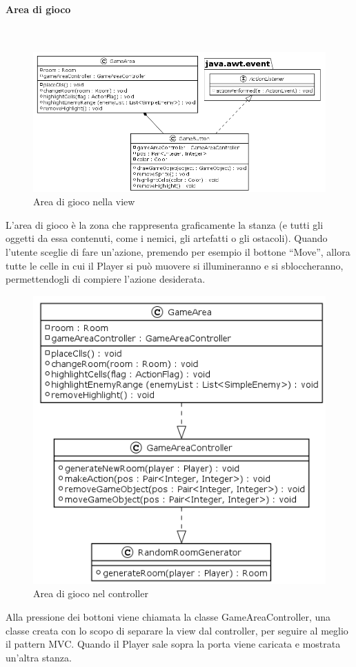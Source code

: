 \documentclass[a4paper,titlepage,12pt]{article}
\begin{document}
\paragraph{Area di gioco}
\par \noindent \\
\begin{figure}[H]
    \centering
    \includegraphics[scale=0.55]{img/uml/GameArea.png}
    \caption{Area di gioco nella view}
    \label{fig: Game Area nella view}
\end{figure}
\par \noindent L’area di gioco è la zona che rappresenta graficamente la stanza (e tutti gli oggetti da essa contenuti, come i nemici, gli artefatti o gli ostacoli).
Quando l’utente sceglie di fare un’azione, premendo per esempio il bottone “Move”, allora tutte le celle in cui il Player si può muovere si illumineranno e si sbloccheranno, permettendogli di compiere l’azione desiderata.
\begin{figure}[H]
    \centering
    \includegraphics[scale=0.7]{img/uml/GameArea2.png}
    \caption{Area di gioco nel controller}
    \label{fig: Game Area nel controller}
\end{figure}
\par \noindent Alla pressione dei bottoni viene chiamata la classe GameAreaController, una classe creata con lo scopo di separare la view dal controller, per seguire al meglio il pattern MVC.
Quando il Player sale sopra la porta viene caricata e mostrata un'altra stanza.
\end{document}
